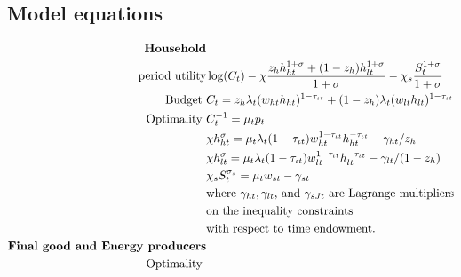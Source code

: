 \subsection{Model equations}
\vspace{-2mm}
\begin{align}
\text{\textbf{Household}}&\nonumber\\ \text{period utility}\vspace{4mm}&  \log(C_t)-\chi\frac{z_hh_{ht}^{1+\sigma}+(1-z_h)h_{lt}^{1+\sigma}}{1+\sigma}-\chi_s\frac{S_t^{1+\sigma}}{{1+\sigma}} \nonumber %
\\
\text{Budget}\ \vspace{4mm}& C_t=z_h \lambda_t (w_{ht}h_{ht})^{1-\tau_{\iota t}}+(1-z_h) \lambda_t (w_{lt}h_{lt})^{1-\tau_{\iota t}}\nonumber\\ %
\text{Optimality}\ \vspace{4mm}
& C_t^{-1}= \mu_tp_{t}\nonumber\\
& \chi h_{ht}^{\sigma}=\mu_t \lambda_t(1-\tau_{\iota t})w_{ht}^{1-\tau_{\iota t}}h_{ht}^{-\tau_{\iota t}}-\gamma_{ht}/z_h\nonumber\\
& \chi h_{lt}^{\sigma}=\mu_t \lambda_t(1-\tau_{\iota t})w_{lt}^{1-\tau_{\iota t}}h_{lt}^{-\tau_{\iota t}}-\gamma_{lt}/(1-z_h)\nonumber\\
& \chi_s S_{t}^{\sigma_s} =\mu_t w_{st}-\gamma_{st} \nonumber\\ %
& \text{where $\gamma_{ht}, \gamma_{lt}$, and $\gamma_{sJt}$ are Lagrange multipliers}\nonumber \\ 
& \text{on the inequality constraints}\nonumber \\ 
& \text{with respect to time endowment.}\nonumber\\
\text{\textbf{Final good and Energy producers}}&\nonumber\\
\text{Optimality}\ \vspace{4mm}&

\end{align}
